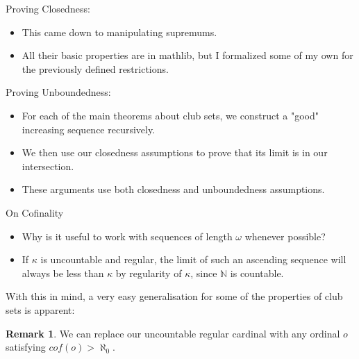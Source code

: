 \documentclass{beamer}
\theoremstyle{definition}
\newtheorem{rem}[subsection]{Remark}
\begin{document}
\begin{frame}{Proving Closedness:}
    \begin{itemize}
        \item[] This came down to manipulating supremums. \pause
        \item[] All their basic properties are in mathlib, but I formalized some of my own for the previously defined restrictions.
    \end{itemize}
\end{frame}

\begin{frame}{Proving Unboundedness:}
    \begin{itemize}
        \item[] For each of the main theorems about club sets, we construct a "good" increasing sequence recursively. \pause
        \item[] We then use our closedness assumptions to prove that its limit is in our intersection.
        \item[] These arguments use both closedness and unboundedness assumptions.
    \end{itemize}
\end{frame}

\begin{frame}{On Cofinality}
    \begin{itemize}
        \item[] Why is it useful to work with sequences of length $\omega$ whenever possible? \pause
        \item[] If $\kappa$ is uncountable and regular, the limit of such an ascending sequence will always be less than $\kappa$ by regularity of $\kappa$, since $\mathbb{N}$ is countable.
    \end{itemize} \pause
    \par With this in mind, a very easy generalisation for some of the properties of club sets is apparent:
    \begin{rem}
        We can replace our uncountable regular cardinal with any ordinal $o$ satisfying $cof(o)>\aleph_0$.
    \end{rem}
\end{frame}
\end{document}
